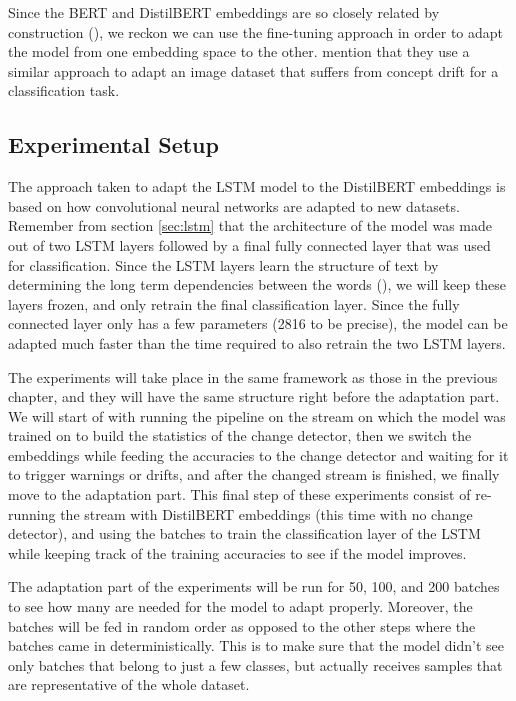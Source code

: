 \documentclass[12pt]{extreport}
\begin{document}
Since the BERT and DistilBERT embeddings are so closely related by construction (\cite{distilbert}), we reckon we can use the fine-tuning approach in order to adapt the model from one embedding space to the other. \cite{fine-tuning-cd-image} mention that they use a similar approach to adapt an image dataset that suffers from concept drift for a classification task.

\subsection{Experimental Setup}

The approach taken to adapt the LSTM model to the DistilBERT embeddings is based on how convolutional neural networks are adapted to new datasets. Remember from section \ref{sec:lstm} that the architecture of the model was made out of two LSTM layers followed by a final fully connected layer that was used for classification. Since the LSTM layers learn the structure of text by determining the long term dependencies between the words (\cite{colahlstm}), we will keep these layers frozen, and only retrain the final classification layer. Since the fully connected layer only has a few parameters (2816 to be precise), the model can be adapted much faster than the time required to also retrain the two LSTM layers.

The experiments will take place in the same framework as those in the previous chapter, and they will have the same structure right before the adaptation part. We will start of with running the pipeline on the stream on which the model was trained on to build the statistics of the change detector, then we switch the embeddings while feeding the accuracies to the change detector and waiting for it to trigger warnings or drifts, and after the changed stream is finished, we finally move to the adaptation part. This final step of these experiments consist of re-running the stream with DistilBERT embeddings (this time with no change detector), and using the batches to train the classification layer of the LSTM while keeping track of the training accuracies to see if the model improves.

The adaptation part of the experiments will be run for 50, 100, and 200 batches to see how many are needed for the model to adapt properly. Moreover, the batches will be fed in random order as opposed to the other steps where the batches came in deterministically. This is to make sure that the model didn't see only batches that belong to just a few classes, but actually receives samples that are representative of the whole dataset.
\end{document}
